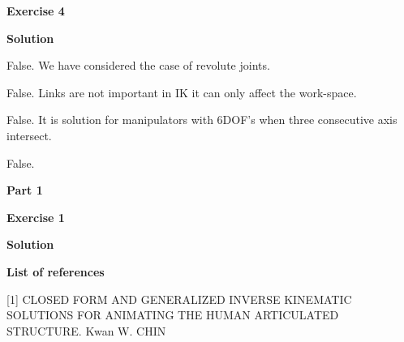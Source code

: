 \documentclass[12pt]{article}
\begin{document}
\textbf{Exercise 4}		
		
\textbf{Solution}

\medskip

\begin{list}{()~}{}
\item False. We have considered the case of revolute joints.
\item False. Links are not important in IK it can only affect the work-space.
\item False. It is solution for manipulators with 6DOF’s when three consecutive axis intersect.
\item False.
\end{list}

\textbf{Part 1}	

\bigskip
	
\textbf{Exercise 1}		
		
\textbf{Solution}

\medskip

\textbf{List of references}

[1] CLOSED FORM AND GENERALIZED INVERSE KINEMATIC SOLUTIONS FOR ANIMATING THE HUMAN ARTICULATED STRUCTURE. Kwan W. CHIN
\end{document}
